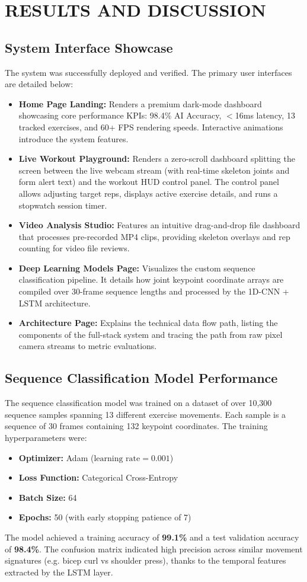\chapter{RESULTS AND DISCUSSION}

\section{System Interface Showcase}
The system was successfully deployed and verified. The primary user interfaces are detailed below:
\begin{itemize}
    \item \textbf{Home Page Landing:} Renders a premium dark-mode dashboard showcasing core performance KPIs: 98.4\% AI Accuracy, $<$16ms latency, 13 tracked exercises, and 60+ FPS rendering speeds. Interactive animations introduce the system features.
    \item \textbf{Live Workout Playground:} Renders a zero-scroll dashboard splitting the screen between the live webcam stream (with real-time skeleton joints and form alert text) and the workout HUD control panel. The control panel allows adjusting target reps, displays active exercise details, and runs a stopwatch session timer.
    \item \textbf{Video Analysis Studio:} Features an intuitive drag-and-drop file dashboard that processes pre-recorded MP4 clips, providing skeleton overlays and rep counting for video file reviews.
    \item \textbf{Deep Learning Models Page:} Visualizes the custom sequence classification pipeline. It details how joint keypoint coordinate arrays are compiled over 30-frame sequence lengths and processed by the 1D-CNN + LSTM architecture.
    \item \textbf{Architecture Page:} Explains the technical data flow path, listing the components of the full-stack system and tracing the path from raw pixel camera streams to metric evaluations.
\end{itemize}

\section{Sequence Classification Model Performance}
The sequence classification model was trained on a dataset of over 10,300 sequence samples spanning 13 different exercise movements. Each sample is a sequence of 30 frames containing 132 keypoint coordinates.
The training hyperparameters were:
\begin{itemize}
    \item \textbf{Optimizer:} Adam ($\text{learning rate} = 0.001$)
    \item \textbf{Loss Function:} Categorical Cross-Entropy
    \item \textbf{Batch Size:} 64
    \item \textbf{Epochs:} 50 (with early stopping patience of 7)
\end{itemize}
The model achieved a training accuracy of \textbf{99.1\%} and a test validation accuracy of \textbf{98.4\%}. The confusion matrix indicated high precision across similar movement signatures (e.g. bicep curl vs shoulder press), thanks to the temporal features extracted by the LSTM layer.

